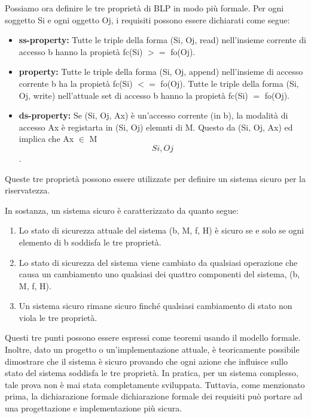 \newpage
Possiamo ora definire le tre proprietà di BLP in modo più formale. Per ogni soggetto Si e ogni oggetto Oj, i requisiti possono essere dichiarati come segue:

\begin{itemize}
    \item \textbf{ss-property:} Tutte le triple della forma (Si, Oj, read) nell'insieme corrente di accesso b hanno la propietà fc(Si) $>=$ fo(Oj).
    
    \item \textbf{property:} Tutte le triple della forma (Si, Oj, append) nell'insieme di accesso corrente b ha la propietà fc(Si) $<=$ fo(Oj). Tutte le triple della forma (Si, Oj, write) nell'attuale set di accesso b hanno la propietà fc(Si) $=$ fo(Oj).
    
    \item \textbf{ds-property:} Se (Si, Oj, Ax) è un'accesso corrente (in b), la modalità di accesso Ax è registarta in (Si, Oj) elemnti di M. Questo da (Si, Oj, Ax) ed implica che Ax $\in$ M\[Si, Oj\].

\end{itemize}
Queste tre proprietà possono essere utilizzate per definire un sistema sicuro per la riservatezza.

\singlespacing

In sostanza, un sistema sicuro è caratterizzato da quanto segue:
\begin{enumerate}
    \item Lo stato di sicurezza attuale del sistema (b, M, f, H) è sicuro se e solo se ogni elemento di b soddisfa le tre proprietà.
    
    \item Lo stato di sicurezza del sistema viene cambiato da qualsiasi operazione che causa un cambiamento uno qualsiasi dei quattro componenti del sistema, (b, M, f, H).
    
    \item Un sistema sicuro rimane sicuro finché qualsiasi cambiamento di stato non viola le tre proprietà.
\end{enumerate}
Questi tre punti possono essere espressi come teoremi usando il modello formale. Inoltre, dato un progetto o un'implementazione attuale, è teoricamente possibile dimostrare che il sistema è sicuro provando che ogni azione che influisce sullo stato del sistema soddisfa le tre proprietà. In pratica, per un sistema complesso, tale prova non è mai stata completamente sviluppata. Tuttavia, come menzionato prima, la dichiarazione formale dichiarazione formale dei requisiti può portare ad una progettazione e implementazione più sicura.

